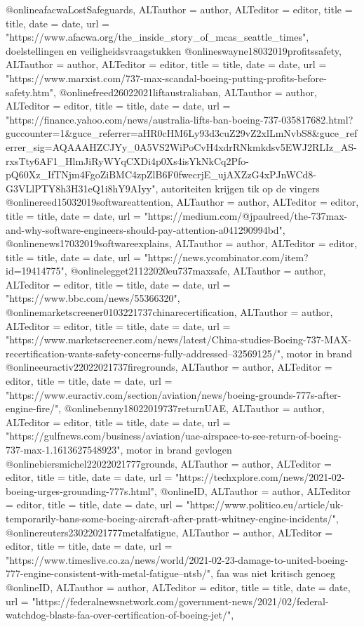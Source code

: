 {{{{{{{{{@online{afacwaLostSafeguards,	ALTauthor = {author},	ALTeditor = {editor},	title = {title},	date = {date},	url = {"https://www.afacwa.org/the_inside_story_of_mcas_seattle_times"},}
doelstellingen en veiligheidsvraagstukken
@online{swayne18032019profitssafety,	ALTauthor = {author},	ALTeditor = {editor},	title = {title},	date = {date},	url = {"https://www.marxist.com/737-max-scandal-boeing-putting-profits-before-safety.htm"},}
@online{freed26022021liftaustraliaban,	ALTauthor = {author},	ALTeditor = {editor},	title = {title},	date = {date},	url = {"https://finance.yahoo.com/news/australia-lifts-ban-boeing-737-035817682.html?guccounter=1&guce_referrer=aHR0cHM6Ly93d3cuZ29vZ2xlLmNvbS8&guce_referrer_sig=AQAAAHZCJYy_0A5VS2WiPoCvH4xdrRNkmkdsv5EWJ2RLIz_AS-rxsTty6AF1_HlmJiRyWYqCXDi4p0Xs4isYkNkCq2Pfo-pQ60Xz_IfTNjm4FgoZiBMC4zpZlB6F0fwecrjE_ujAXZzG4xPJnWCd8-G3VLlPTY8h3H31eQ1i8hY9AIyy"},}
autoriteiten krijgen tik op de vingers
@online{reed15032019softwareattention,	ALTauthor = {author},	ALTeditor = {editor},	title = {title},	date = {date},	url = {"https://medium.com/@jpaulreed/the-737max-and-why-software-engineers-should-pay-attention-a041290994bd"},}
@online{news17032019softwareexplains,	ALTauthor = {author},	ALTeditor = {editor},	title = {title},	date = {date},	url = {"https://news.ycombinator.com/item?id=19414775"},}
@online{legget21122020eu737maxsafe,	ALTauthor = {author},	ALTeditor = {editor},	title = {title},	date = {date},	url = {"https://www.bbc.com/news/55366320"},}
@online{marketscreener0103221737chinarecertification,	ALTauthor = {author},	ALTeditor = {editor},	title = {title},	date = {date},	url = {"https://www.marketscreener.com/news/latest/China-studies-Boeing-737-MAX-recertification-wants-safety-concerns-fully-addressed--32569125/"},}
motor in brand
@online{euractiv22022021737firegrounds,	ALTauthor = {author},	ALTeditor = {editor},	title = {title},	date = {date},	url = {"https://www.euractiv.com/section/aviation/news/boeing-grounds-777s-after-engine-fire/"},}
@online{benny18022019737returnUAE,	ALTauthor = {author},	ALTeditor = {editor},	title = {title},	date = {date},	url = {"https://gulfnews.com/business/aviation/uae-airspace-to-see-return-of-boeing-737-max-1.1613627548923"},}
motor in brand gevlogen
@online{biersmichel22022021777grounds,	ALTauthor = {author},	ALTeditor = {editor},	title = {title},	date = {date},	url = {"https://techxplore.com/news/2021-02-boeing-urges-grounding-777s.html"},}
@online{ID,	ALTauthor = {author},	ALTeditor = {editor},	title = {title},	date = {date},	url = {"https://www.politico.eu/article/uk-temporarily-bans-some-boeing-aircraft-after-pratt-whitney-engine-incidents/"},}
@online{reuters23022021777metalfatigue,	ALTauthor = {author},	ALTeditor = {editor},	title = {title},	date = {date},	url = {"https://www.timeslive.co.za/news/world/2021-02-23-damage-to-united-boeing-777-engine-consistent-with-metal-fatigue--ntsb/"},}
faa was niet kritisch genoeg
@online{ID,	ALTauthor = {author},	ALTeditor = {editor},	title = {title},	date = {date},	url = {"https://federalnewsnetwork.com/government-news/2021/02/federal-watchdog-blasts-faa-over-certification-of-boeing-jet/"},}


}}}}}}}}}
